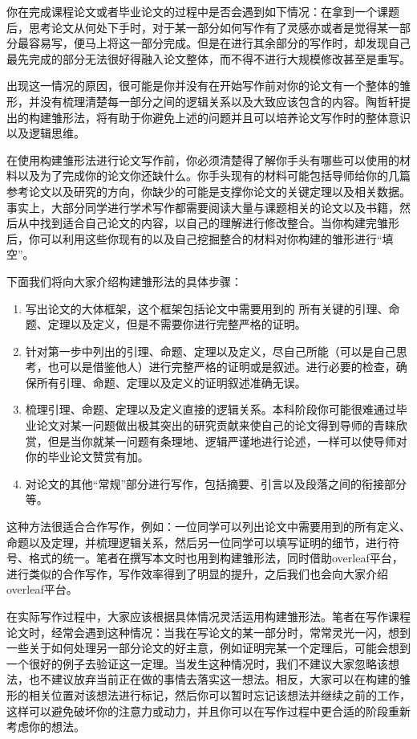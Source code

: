 \documentclass{formatBook}
\begin{document}
你在完成课程论文或者毕业论文的过程中是否会遇到如下情况：在拿到一个课题后，思考论文从何处下手时，对于某一部分如何写作有了灵感亦或者是觉得某一部分最容易写，便马上将这一部分完成。但是在进行其余部分的写作时，却发现自己最先完成的部分无法很好得融入论文整体，而不得不进行大规模修改甚至是重写。\par
出现这一情况的原因，很可能是你并没有在开始写作前对你的论文有一个整体的雏形，并没有梳理清楚每一部分之间的逻辑关系以及大致应该包含的内容。陶哲轩提出的构建雏形法，将有助于你避免上述的问题并且可以培养论文写作时的整体意识以及逻辑思维。\par
在使用构建雏形法进行论文写作前，你必须清楚得了解你手头有哪些可以使用的材料以及为了完成你的论文你还缺什么。你手头现有的材料可能包括导师给你的几篇参考论文以及研究的方向，你缺少的可能是支撑你论文的关键定理以及相关数据。事实上，大部分同学进行学术写作都需要阅读大量与课题相关的论文以及书籍，然后从中找到适合自己论文的内容，以自己的理解进行修改整合。当你构建完雏形后，你可以利用这些你现有的以及自己挖掘整合的材料对你构建的雏形进行“填空”。\par
下面我们将向大家介绍构建雏形法的具体步骤：
\begin{enumerate}
    \item 写出论文的大体框架，这个框架包括论文中需要用到的 所有关键的引理、命题、定理以及定义，但是不需要你进行完整严格的证明。
    \item 针对第一步中列出的引理、命题、定理以及定义，尽自己所能（可以是自己思考，也可以是借鉴他人）进行完整严格的证明或是叙述。进行必要的检查，确保所有引理、命题、定理以及定义的证明叙述准确无误。 
    \item 梳理引理、命题、定理以及定义直接的逻辑关系。本科阶段你可能很难通过毕业论文对某一问题做出极其突出的研究贡献来使自己的论文得到导师的青睐欣赏，但是当你就某一问题有条理地、逻辑严谨地进行论述，一样可以使导师对你的毕业论文赞赏有加。
    \item 对论文的其他“常规”部分进行写作，包括摘要、引言以及段落之间的衔接部分等。
\end{enumerate}
\par
这种方法很适合合作写作，例如：一位同学可以列出论文中需要用到的所有定义、命题以及定理，并梳理逻辑关系，然后另一位同学可以填写证明的细节，进行符号、格式的统一。笔者在撰写本文时也用到构建雏形法，同时借助overleaf平台，进行类似的合作写作，写作效率得到了明显的提升，之后我们也会向大家介绍overleaf平台。\par
在实际写作过程中，大家应该根据具体情况灵活运用构建雏形法。笔者在写作课程论文时，经常会遇到这种情况：当我在写论文的某一部分时，常常灵光一闪，想到一些关于如何处理另一部分论文的好主意，例如证明完某一个定理后，可能会想到一个很好的例子去验证这一定理。当发生这种情况时，我们不建议大家忽略该想法，也不建议放弃当前正在做的事情去落实这一想法。相反，大家可以在构建的雏形的相关位置对该想法进行标记，然后你可以暂时忘记该想法并继续之前的工作，这样可以避免破坏你的注意力或动力，并且你可以在写作过程中更合适的阶段重新考虑你的想法。
\end{document}
